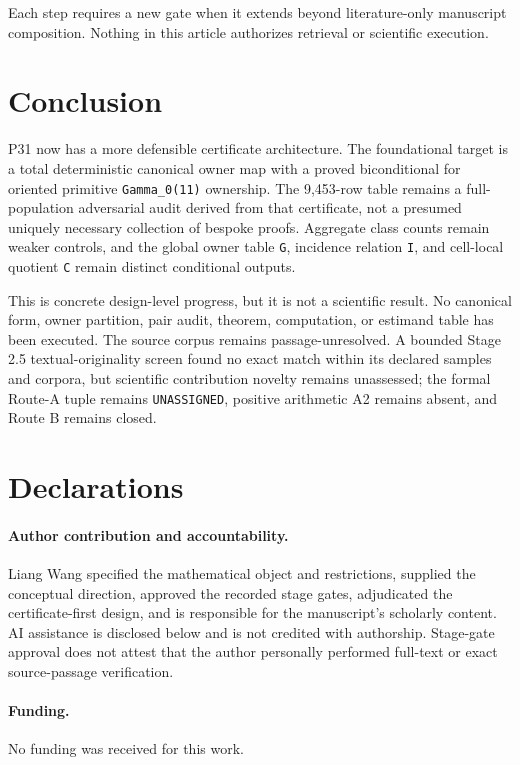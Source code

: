 \documentclass[11pt]{article}
\begin{document}
Each step requires a new gate when it extends beyond literature-only
manuscript composition. Nothing in this article authorizes retrieval or
scientific execution.

\hypertarget{10-conclusion}{%
\section{Conclusion}\label{10-conclusion}}

P31 now has a more defensible certificate architecture. The foundational
target is a total deterministic canonical owner map with a proved
biconditional for oriented primitive \texttt{Gamma\_0(11)} ownership.
The 9,453-row table remains a full-population adversarial audit derived
from that certificate, not a presumed uniquely necessary collection of
bespoke proofs. Aggregate class counts remain weaker controls, and the
global owner table \texttt{G}, incidence relation \texttt{I}, and
cell-local quotient \texttt{C} remain distinct conditional outputs.

This is concrete design-level progress, but it is not a scientific
result. No canonical form, owner partition, pair audit, theorem,
computation, or estimand table has been executed. The source corpus
remains passage-unresolved. A bounded Stage 2.5 textual-originality
screen found no exact match within its declared samples and corpora, but
scientific contribution novelty remains unassessed; the formal Route-A
tuple remains \texttt{UNASSIGNED}, positive arithmetic A2 remains absent,
and Route B remains closed.

\section*{Declarations}

\paragraph{Author contribution and accountability.}
Liang Wang specified the mathematical object and restrictions, supplied
the conceptual direction, approved the recorded stage gates,
adjudicated the certificate-first design, and is responsible for the
manuscript's scholarly content. AI assistance is disclosed below and is
not credited with authorship. Stage-gate approval does not attest that
the author personally performed full-text or exact source-passage
verification.

\paragraph{Funding.} No funding was received for this work.
\end{document}
